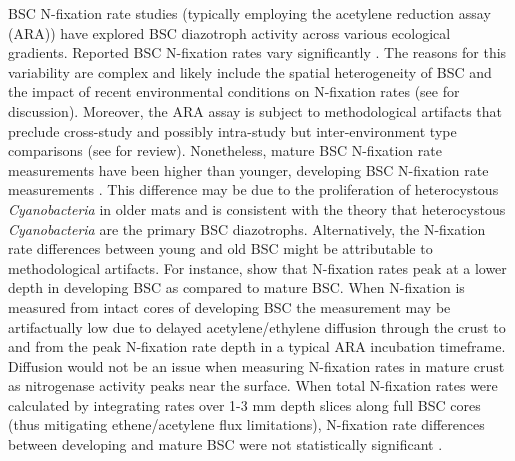 BSC N-fixation rate studies (typically employing the acetylene reduction assay
(ARA)) have explored BSC diazotroph activity across various ecological
gradients. Reported BSC N-fixation rates vary significantly \citep{Evans_2001}.
The reasons for this variability are complex and likely include the spatial
heterogeneity of BSC \citep{Evans_2001} and the impact of recent environmental
conditions on N-fixation rates (see \citet{Belnap_2001} for discussion).
Moreover, the ARA assay is subject to methodological artifacts that preclude
cross-study and possibly intra-study but inter-environment type comparisons
(see \citet{Belnap_2001} for review). Nonetheless, mature BSC N-fixation rate
measurements have been higher than younger, developing BSC N-fixation rate
measurements \citep{Belnap_2002, 14766579}. This difference may be due to the
proliferation of heterocystous \textit{Cyanobacteria} in older mats and is
consistent with the theory that heterocystous \textit{Cyanobacteria} are the
primary BSC diazotrophs.  Alternatively, the N-fixation rate differences
between young and old BSC might be attributable to methodological artifacts.
For instance, \citet{15643930} show that N-fixation rates peak at a lower depth
in developing BSC as compared to mature BSC. When N-fixation is measured from
intact cores of developing BSC the measurement may be artifactually low due to
delayed acetylene/ethylene diffusion through the crust to and from the peak
N-fixation rate depth in a typical ARA incubation timeframe. Diffusion would
not be an issue when measuring N-fixation rates in mature crust as nitrogenase
activity peaks near the surface. When total N-fixation rates were calculated by
integrating rates over 1-3 mm depth slices along full BSC cores (thus
mitigating ethene/acetylene flux limitations), N-fixation rate differences
between developing and mature BSC were not statistically significant
\citep{15643930}.


